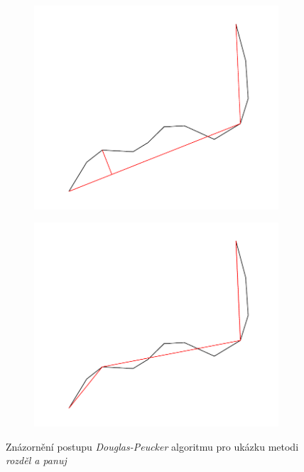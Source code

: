 \begin{figure}[h]
\begin{subfigure}{0.5\textwidth}
  \includegraphics[width=\linewidth]{./pictures/3/douglas-peucker_3.pdf}
  \label{fig:3-douglas-peucker_3}
\end{subfigure}\hfil %
\begin{subfigure}{0.5\textwidth}
  \includegraphics[width=\linewidth]{./pictures/3/douglas-peucker_4.pdf}
  \label{fig:3-douglas-peucker_4}
\end{subfigure}\hfil %
\caption{Znázornění postupu \textit{Douglas-Peucker} algoritmu pro ukázku metodi \textit{rozděl a panuj}}
\end{figure}
	

